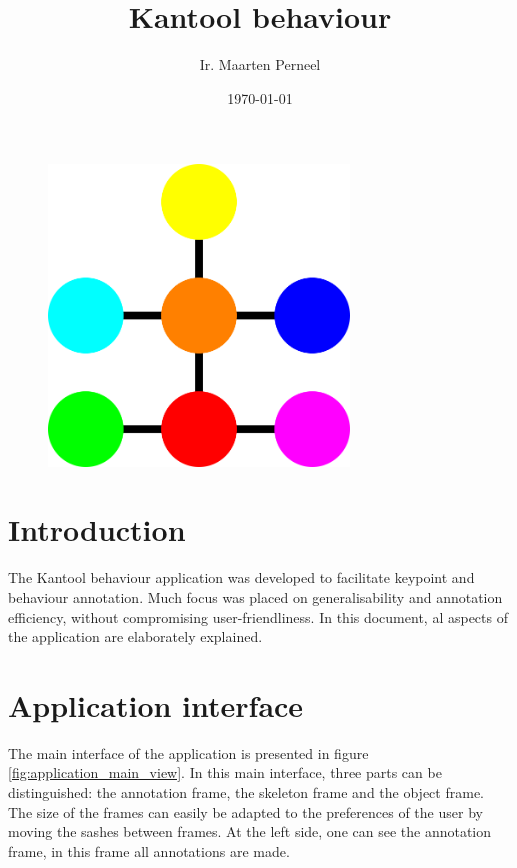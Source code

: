 \documentclass[a4paper, 11pt]{article}
\title{\bf{Kantool behaviour}}
\author{Ir. Maarten Perneel}
\date{\today}
\begin{document}
\maketitle
\thispagestyle{empty}

\begin{figure}[h]
	\centering
	\includegraphics[width=8cm]{Kantool_behaviour_icon}
\end{figure}

\newpage

\tableofcontents
\newpage

\section{Introduction}
The Kantool behaviour application was developed to facilitate keypoint and behaviour annotation. Much focus was placed on generalisability and annotation efficiency, without compromising user-friendliness. In this document, al aspects of the application are elaborately explained.

\section{Application interface}
The main interface of the application is presented in figure \ref{fig:application_main_view}. In this main interface, three parts can be distinguished: the annotation frame, the skeleton frame and the object frame. The size of the frames can easily be adapted to the preferences of the user by moving the sashes between frames. At the left side, one can see the annotation frame, in this frame all annotations are made.
\end{document}
